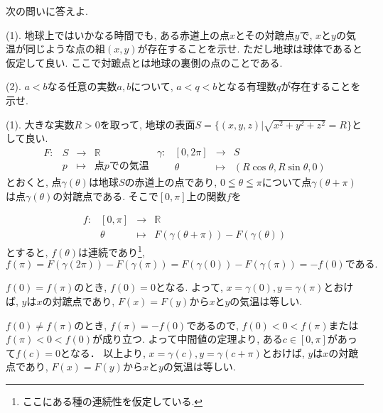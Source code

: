 \documentclass[dvipdfmx,a4paper,11pt]{article}
\newcommand{\R}{\mathbb{R}}
\theoremstyle{definition}
\begin{document}
次の問いに答えよ.

\vspace{11pt}

(1).
地球上ではいかなる時間でも, ある赤道上の点$x$とその対蹠点$y$で, $x$と$y$の気温が同じような点の組$(x,y)$が存在することを示せ.
ただし地球は球体であると仮定して良い.
ここで対蹠点とは地球の裏側の点のことである.

\vspace{11pt}
 
(2). $a<b$なる任意の実数$a,b$について, $a<q<b$となる有理数$q$が存在することを示せ.

  \vspace{11pt}
 
\hspace{-11pt}{\Large $\bullet$ 中間レポートおまけ問題解答例.}

(1). 大きな実数$R>0$を取って, 地球の表面$S= \{ (x,y,z) | \sqrt{x^2 + y^2 + z^2} = R \}$として良い.
$$
\begin{array}{cccc}
F: &S& \rightarrow & \R  \\
&p& \longmapsto & \text{点$p$での気温}
\end{array}
\begin{array}{cccc}
\gamma: &[0,2\pi]& \rightarrow & S  \\
&\theta& \longmapsto & (R \cos \theta, R \sin \theta, 0)
\end{array}
$$
とおくと, 点$\gamma(\theta)$は地球$S$の赤道上の点であり,
$0 \leqq \theta \leqq \pi $について点$\gamma(\theta + \pi)$は点$\gamma(\theta )$の対蹠点である. そこで$[0,\pi]$上の関数$f$を

$$
\begin{array}{cccc}
f: &[0,\pi]& \rightarrow & \R  \\
&\theta& \longmapsto & F(\gamma(\theta + \pi)) - F(\gamma(\theta ))
\end{array}
$$
とすると, $f(\theta)$は連続であり\footnote{ここにある種の連続性を仮定している.}, 
$$f(\pi) = F(\gamma(2 \pi)) - F(\gamma(\pi ))
= F(\gamma(0)) - F(\gamma(\pi )) = - f(0) \text{である.}$$

$f(0)=f(\pi)$のとき, $f(0)=0$となる.
よって, $x=\gamma(0), y=\gamma(\pi)$とおけば, 
$y$は$x$の対蹠点であり, $F(x) = F(y)$から$x$と$y$の気温は等しい.

$f(0) \neq f(\pi)$のとき, $f(\pi) = -f(0)$であるので, 
$f(0) < 0 <f(\pi)$または$f(\pi) < 0 <f(0)$が成り立つ.
よって中間値の定理より, ある$c \in [0 , \pi]$があって$f(c)=0$となる．
以上より, $x=\gamma(c), y=\gamma(c+\pi)$とおけば, 
$y$は$x$の対蹠点であり, $F(x) = F(y)$から$x$と$y$の気温は等しい.
\end{document}
